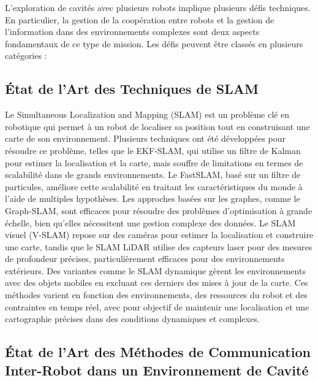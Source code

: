 \documentclass[main.tex]{subfiles}
\begin{document}
L'exploration de cavités avec plusieurs robots implique plusieurs défis techniques. En particulier, la gestion de la coopération entre robots et la gestion de l'information dans des environnements complexes sont deux aspects fondamentaux de ce type de mission. Les défis peuvent être classés en plusieurs catégories : 

\subsection{État de l'Art des Techniques de SLAM}

Le Simultaneous Localization and Mapping (SLAM) est un problème clé en robotique qui permet à un robot de localiser sa position tout en construisant une carte de son environnement. Plusieurs techniques ont été développées pour résoudre ce problème, telles que le EKF-SLAM, qui utilise un filtre de Kalman pour estimer la localisation et la carte, mais souffre de limitations en termes de scalabilité dans de grands environnements. Le FastSLAM, basé sur un filtre de particules, améliore cette scalabilité en traitant les caractéristiques du monde à l'aide de multiples hypothèses. Les approches basées sur les graphes, comme le Graph-SLAM, sont efficaces pour résoudre des problèmes d'optimisation à grande échelle, bien qu'elles nécessitent une gestion complexe des données. Le SLAM visuel (V-SLAM) repose sur des caméras pour estimer la localisation et construire une carte, tandis que le SLAM LiDAR utilise des capteurs laser pour des mesures de profondeur précises, particulièrement efficaces pour des environnements extérieurs. Des variantes comme le SLAM dynamique gèrent les environnements avec des objets mobiles en excluant ces derniers des mises à jour de la carte. Ces méthodes varient en fonction des environnements, des ressources du robot et des contraintes en temps réel, avec pour objectif de maintenir une localisation et une cartographie précises dans des conditions dynamiques et complexes.


\subsection{État de l'Art des Méthodes de Communication Inter-Robot dans un Environnement de Cavité}
\end{document}
